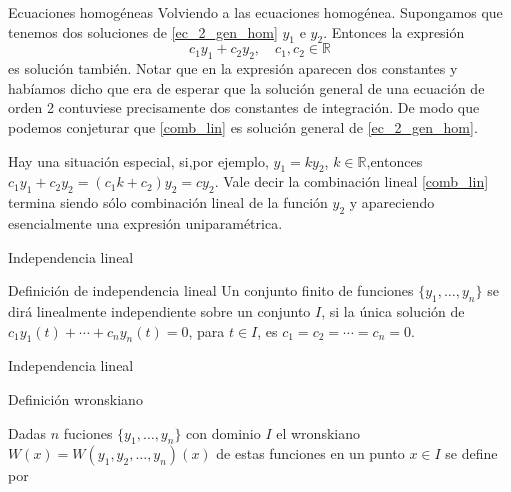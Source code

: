 \documentclass[handout,hyperref={colorlinks=true}]{beamer}
\newcommand{\rr}{\mathbb{R}}
\newcommand{\nl}{\onslide<+-> }
\begin{document}
\begin{frame}{Ecuaciones homogéneas}
\nl Volviendo a las ecuaciones homogénea. Supongamos que tenemos dos soluciones de \eqref{ec_2_gen_hom} $y_1$ e $y_2$. Entonces la expresión 
\begin{equation}\label{comb_lin}
   c_1y_1+c_2y_2,\quad c_1,c_2\in\rr
\end{equation}
es solución también. \nl Notar que en la expresión aparecen dos constantes y habíamos dicho que era de esperar que la solución general de una ecuación de orden 2 contuviese
precisamente dos constantes de integración. De modo que podemos conjeturar que \eqref{comb_lin} es solución general de \eqref{ec_2_gen_hom}. 

\nl Hay una situación especial, si,por ejemplo, $y_1=ky_2$, $k\in\rr$,entonces $c_1y_1+c_2y_2=(c_1k+c_2)y_2=cy_2$. Vale decir la combinación lineal \eqref{comb_lin}
termina siendo sólo combinación lineal de la función $y_2$ y apareciendo esencialmente una expresión uniparamétrica.  
\end{frame}

\begin{frame}{Independencia lineal}
 
\begin{block}{Definición de independencia lineal}
 Un conjunto finito de funciones $\{y_1,\ldots,y_n\}$ se dirá linealmente independiente sobre un conjunto $I$, 
 si la única solución de $c_1y_1(t)+\cdots+c_ny_n(t)=0$, para $t\in I$, es $c_1=c_2=\cdots=c_n=0$.
\end{block}

\end{frame}

\begin{frame}{Independencia lineal}
 
\begin{block}{Definición wronskiano}

Dadas $n$ fuciones  $\{y_1,\ldots,y_n\}$ con dominio $I$ el wronskiano $W(x)=W(y_1,y_2,\ldots,y_n)(x)$ de estas funciones en un punto $x\in I$ se define por
\end{block}
\end{frame}
\end{document}
